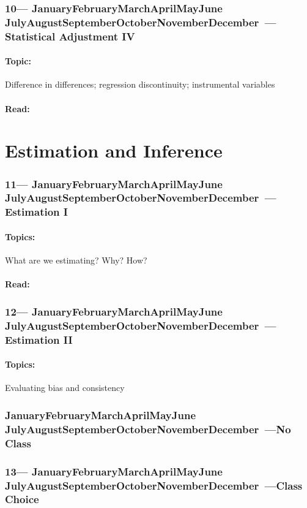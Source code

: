 \documentclass[10pt]{article}
\def\themonth{\ifcase\month\or
	January\or February\or March\or April\or May\or June\or
	July\or August\or September\or October\or November\or December\fi}
\begin{document}
\AdvanceDate[7]
\section{10---\themonth~\the\day---Statistical Adjustment IV}

\subsection{Topic:} Difference in differences; regression discontinuity;
instrumental variables
\subsection{Read:}

\part{Estimation and Inference}

\AdvanceDate[7]

\section{11---\themonth~\the\day---Estimation I}

\subsection{Topics:} What are we estimating? Why? How?
\subsection{Read:}

\AdvanceDate[7]
\section{12---\themonth~\the\day---Estimation II}

\subsection{Topics:} Evaluating bias and consistency

\AdvanceDate[7]
\section{\themonth~\the\day---No Class}

\AdvanceDate[7]
\section{13---\themonth~\the\day---Class Choice}
\end{document}
